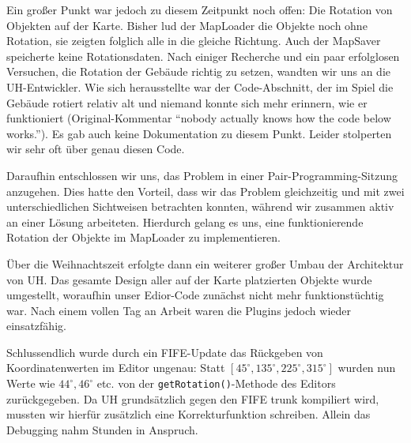 Ein großer Punkt war jedoch zu diesem Zeitpunkt noch offen: Die Rotation von
Objekten auf der Karte.
Bisher lud der MapLoader die Objekte noch ohne Rotation, sie zeigten folglich
alle in die gleiche Richtung. Auch der MapSaver speicherte keine Rotationsdaten.
Nach einiger Recherche und ein paar erfolglosen Versuchen, die Rotation der
Gebäude richtig zu setzen, wandten wir uns an die UH-Entwickler.
Wie sich herausstellte war der Code-Abschnitt, der im Spiel die Gebäude rotiert
relativ alt und niemand konnte sich mehr erinnern, wie er funktioniert
(Original-Kommentar ``nobody actually knows how the code below works.'').
Es gab auch keine Dokumentation zu diesem Punkt. Leider stolperten wir sehr oft
über genau diesen Code.

Daraufhin entschlossen wir uns, das Problem in einer Pair-Programming-Sitzung anzugehen. Dies hatte
den Vorteil, dass wir das Problem gleichzeitig und mit zwei unterschiedlichen Sichtweisen betrachten
konnten, während wir zusammen aktiv an einer Lösung arbeiteten. Hierdurch gelang es uns, eine funktionierende
Rotation der Objekte im MapLoader zu implementieren.

Über die Weihnachtszeit erfolgte dann ein weiterer großer Umbau der Architektur
von UH. Das gesamte Design aller auf der Karte platzierten Objekte wurde
umgestellt, woraufhin unser Edior-Code zunächst nicht mehr funktionstüchtig war.
Nach einem vollen Tag an Arbeit waren die Plugins jedoch wieder einsatzfähig.


Schlussendlich wurde durch ein FIFE-Update das Rückgeben von Koordinatenwerten
im Editor ungenau: Statt $[45^\circ, 135^\circ, 225^\circ, 315^\circ]$ wurden
nun Werte wie $44^\circ, 46^\circ$ etc. von der {\tt getRotation()}-Methode des
Editors zurückgegeben. Da UH grundsätzlich gegen den FIFE trunk kompiliert wird,
mussten wir hierfür zusätzlich eine Korrekturfunktion schreiben. Allein das
Debugging nahm Stunden in Anspruch.

